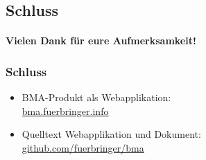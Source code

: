 \documentclass[professionalfont,serif,german]{beamer}
\begin{document}

\begin{frame}
  \section[Vielen Dank für eure Aufmerksamkeit!]{Schluss}
  \framesubtitle{Vielen Dank für eure Aufmerksamkeit!}
  \frametitle{Schluss}
  \begin{itemize}
    \item BMA-Produkt als Webapplikation:\\ \url{bma.fuerbringer.info}
    \item Quelltext Webapplikation und Dokument:\\
      \url{github.com/fuerbringer/bma}
  \end{itemize}
\end{frame}
\end{document}
